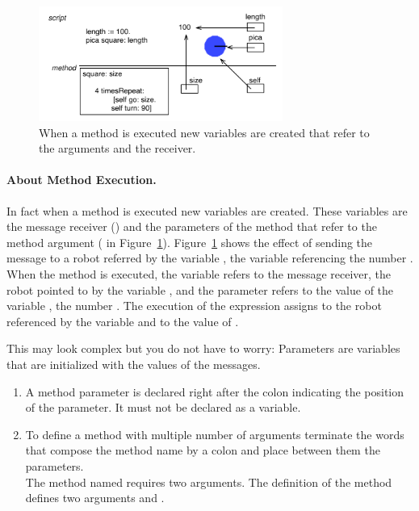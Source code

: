 \begin{figure}[h]
\begin{center}\includegraphics[width=8cm]{argumentBoxes}\end{center}
\caption{When a method is executed new variables are created that refer to the arguments and the receiver. \label{fig:argumentswithboxes}}
\end{figure}


\paragraph{About Method Execution.}
In fact when a method is executed new variables are created. These variables are the message receiver () and the parameters of the method that refer to the method argument (  in Figure~\ref{fig:argumentswithboxes}). Figure~\ref{fig:argumentswithboxes} shows the effect of sending the message  to a robot referred by the variable , the variable  referencing the number . When the method  is executed, the variable  refers to the message receiver, \ie the robot pointed to by the variable , and the parameter  refers to the value of the variable , \ie the number . 
The execution of the expression  assigns to \self the robot referenced by the variable \daly and  to the value of . 

This may look complex but you do not have to worry: Parameters are variables that are initialized with the values of the messages.



\summa

\begin{enumerate}
  \item A method parameter is declared right after the colon
  indicating the position of the parameter. It must not be declared as a  variable.
  
 \item To define a method with multiple number of arguments terminate the words that compose the method name by a colon and place between them the parameters.\\
The method named  requires two arguments. The definition of the method  defines two arguments  and .\end{enumerate}



\ifx\wholebook\relax\else\fi
